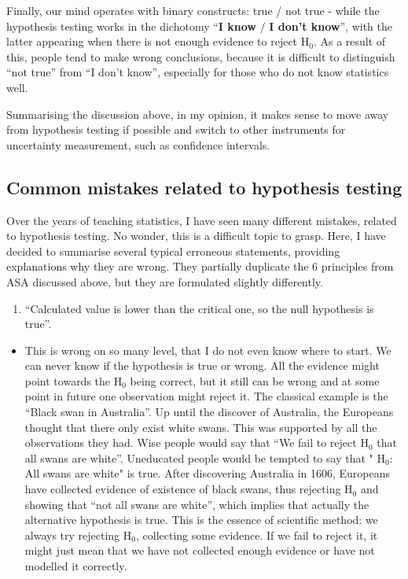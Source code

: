 \documentclass[
]{book}
\providecommand{\tightlist}{%
  \setlength{\itemsep}{0pt}\setlength{\parskip}{0pt}}
\theoremstyle{definition}
\theoremstyle{definition}
\theoremstyle{definition}
\theoremstyle{definition}
\theoremstyle{remark}
\begin{document}
Finally, our mind operates with binary constructs: true / not true - while the hypothesis testing works in the dichotomy ``\textbf{I know} / \textbf{I don't know}'', with the latter appearing when there is not enough evidence to reject \(\mathrm{H}_0\). As a result of this, people tend to make wrong conclusions, because it is difficult to distinguish ``not true'' from ``I don't know'', especially for those who do not know statistics well.

Summarising the discussion above, in my opinion, it makes sense to move away from hypothesis testing if possible and switch to other instruments for uncertainty measurement, such as confidence intervals.

\hypertarget{hypothesisTestingMistakes}{%
\subsection{Common mistakes related to hypothesis testing}\label{hypothesisTestingMistakes}}

Over the years of teaching statistics, I have seen many different mistakes, related to hypothesis testing. No wonder, this is a difficult topic to grasp. Here, I have decided to summarise several typical erroneous statements, providing explanations why they are wrong. They partially duplicate the 6 principles from ASA discussed above, but they are formulated slightly differently.

\begin{enumerate}
\def\labelenumi{\arabic{enumi}.}
\tightlist
\item
  ``Calculated value is lower than the critical one, so the null hypothesis is true''.
\end{enumerate}

\begin{itemize}
\tightlist
\item
  This is wrong on so many level, that I do not even know where to start. We can never know if the hypothesis is true or wrong. All the evidence might point towards the \(\mathrm{H}_0\) being correct, but it still can be wrong and at some point in future one observation might reject it. The classical example is the ``Black swan in Australia''. Up until the discover of Australia, the Europeans thought that there only exist white swans. This was supported by all the observations they had. Wise people would say that ``We fail to reject \(\mathrm{H}_0\) that all swans are white''. Uneducated people would be tempted to say that " \(\mathrm{H}_0\): All swans are white" is true. After discovering Australia in 1606, Europeans have collected evidence of existence of black swans, thus rejecting \(\mathrm{H}_0\) and showing that ``not all swans are white'', which implies that actually the alternative hypothesis is true. This is the essence of scientific method: we always try rejecting \(\mathrm{H}_0\), collecting some evidence. If we fail to reject it, it might just mean that we have not collected enough evidence or have not modelled it correctly.
\end{itemize}
\end{document}
